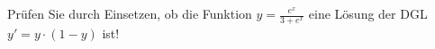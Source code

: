\item Prüfen Sie durch Einsetzen, ob die Funktion $y = \frac{e^x}{3+e^x}$ eine Lösung der DGL $y' = y\cdot(1-y)$ ist!
